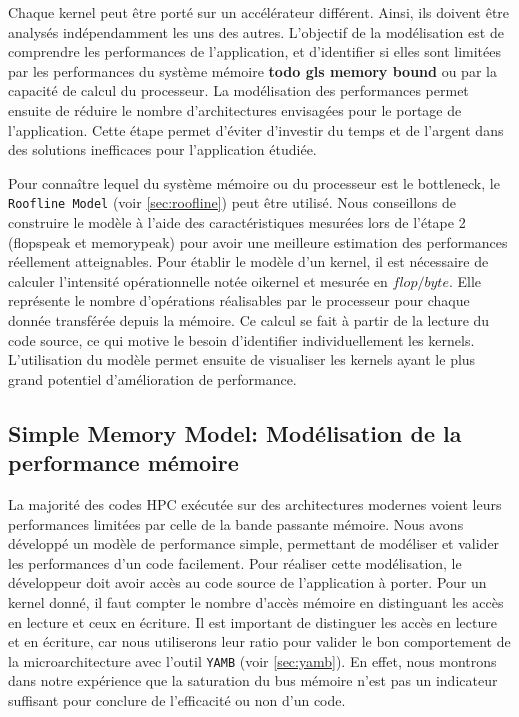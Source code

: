     Chaque \gls{kernel} peut être porté sur un accélérateur différent. Ainsi, ils doivent être analysés indépendamment les uns des autres. L'objectif de la modélisation est de comprendre les performances de l'application, et d'identifier si elles sont limitées par les performances du système mémoire \textbf{todo gls memory bound} ou par la capacité de calcul du processeur. La modélisation des performances permet ensuite de réduire le nombre d'architectures envisagées pour le portage de l'application. Cette étape permet d'éviter d'investir du temps et de l'argent dans des solutions inefficaces pour l'application étudiée. 
    
    Pour connaître lequel du système mémoire ou du processeur est le \gls{bottleneck}, le \verb|Roofline Model| (voir \autoref{sec:roofline}) peut être utilisé. Nous conseillons de construire le modèle à l'aide des caractéristiques mesurées lors de l'étape 2 (\gls{flopspeak} et \gls{memorypeak}) pour avoir une meilleure estimation des performances réellement atteignables. Pour établir le modèle d'un kernel, il est nécessaire de calculer l'intensité opérationnelle notée \gls{oikernel} et mesurée en $flop/byte$. Elle représente le nombre d'opérations réalisables par le processeur pour chaque donnée transférée depuis la mémoire. Ce calcul se fait à partir de la lecture du code source, ce qui motive le besoin d'identifier individuellement les \glspl{kernel}. 
    L'utilisation du modèle permet ensuite de visualiser les kernels ayant le plus grand potentiel d'amélioration de performance. 


\subsection{Simple Memory Model: Modélisation de la performance mémoire} \label{sec:smm}

    La majorité des codes HPC exécutée sur des architectures modernes voient leurs performances limitées par celle de la bande passante mémoire. Nous avons développé un modèle de performance simple, permettant de modéliser et valider les performances d'un code facilement. Pour réaliser cette modélisation, le développeur doit avoir accès au code source de l'application à porter. Pour un \gls{kernel} donné, il faut compter le nombre d'accès mémoire en distinguant les accès en lecture et ceux en écriture. Il est important de distinguer les accès en lecture et en écriture, car nous utiliserons leur ratio pour valider le bon comportement de la microarchitecture avec l'outil \verb|YAMB| (voir \autoref{sec:yamb}). En effet, nous montrons dans notre expérience que la saturation du bus mémoire n'est pas un indicateur suffisant pour conclure de l'efficacité ou non d'un code.
    
